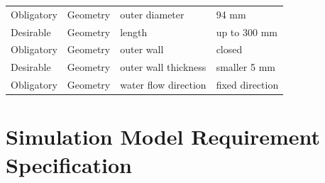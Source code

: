 \documentclass[journal,article,processes,submit,moreauthors,pdftex]{Definitions/mdpi}
\begin{document}
\begin{table}[H]
\begin{tabular}{llll}
Obligatory                                                                          & Geometry          & outer diameter                  & 94 mm                   \\
Desirable                                                                           & Geometry          & length                          & up to 300 mm            \\
Obligatory                                                                          & Geometry          & outer wall                      & closed                  \\
Desirable                                                                           & Geometry          & outer wall thickness            & smaller 5 mm            \\
Obligatory                                                                          & Geometry          & water flow direction            & fixed direction         \\
\bottomrule
\end{tabular}
\end{table}

\section{Simulation Model Requirement Specification}
\end{document}
